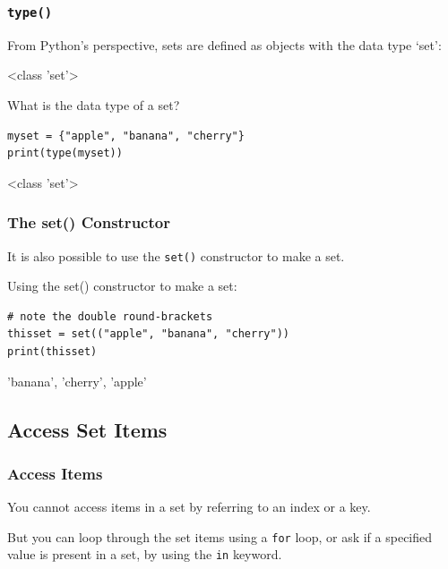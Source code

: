 \documentclass[12pt,a4paper]{article}
\newcommand{\code}[1]{%
	\colorbox{backcolour}{\lstinline{#1}}%
}
\newcommand{\lcode}[1]{%
	\lstinline{#1}%
}
\begin{document}
\subsubsection{\lcode{type()}}

From Python's perspective, sets are defined as objects with the data type `set':

\begin{vercode}
 <class 'set'>
\end{vercode}

\begin{ebox}
What is the data type of a set?
	\begin{lstlisting}
myset = {"apple", "banana", "cherry"}
print(type(myset))
	\end{lstlisting}
\tcblower
	\begin{vercode}
 <class 'set'> 
	\end{vercode}
\end{ebox}
\subsubsection{The set() Constructor}

It is also possible to use the \code{set()} constructor to make a set.

\begin{ebox}
Using the set() constructor to make a set:
	\begin{lstlisting}
# note the double round-brackets
thisset = set(("apple", "banana", "cherry"))
print(thisset)
	\end{lstlisting}
\tcblower
	\begin{vercode}
{'banana', 'cherry', 'apple'}
	\end{vercode}
\end{ebox}

\subsection{Access Set Items}

\subsubsection{Access Items}

You cannot access items in a set by referring to an index or a key.

But you can loop through the set items using a \code{for} loop, or ask if a
specified value is present in a set, by using the \code{in} keyword.
\end{document}
